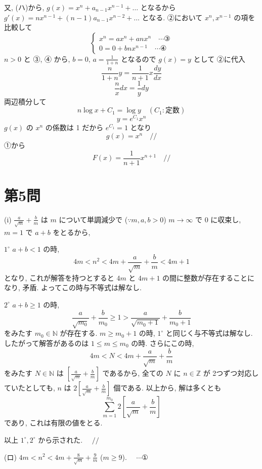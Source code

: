 \documentclass[../main.tex]{subfiles}
\begin{document}
\noindent
又, (ハ)から, $g(x) = x^n + a_{n-1} x^{n-1} + \dots$ となるから $g'(x) = n x^{n-1} + (n-1) a_{n-1} x^{n-2} + \dots$ となる. ②において $x^n, x^{n-1}$ の項を比較して
\begin{equation}
  \begin{cases}
    x^n = a x^n + a n x^n \quad \cdots \text{③} \\
    0 = 0 + b n x^{n-1} \quad \cdots \text{④}
  \end{cases}
\end{equation}
$n > 0$ と ③, ④ から, $b = 0, \, a = \frac{1}{1+n}$ となるので $g(x) = y$ として ②に代入
\[
  \frac{n}{1+n} y = \frac{1}{n+1} x \frac{dy}{dx}
\]
\[
  \frac{n}{x} dx = \frac{1}{y} dy
\]
両辺積分して
\[
  n \log x + C_1 = \log y \quad (C_1: \text{定数})
\]
\[
  y = e^{C_1} x^n
\]
$g(x)$ の $x^n$ の係数は 1 だから $e^{C_1} = 1$ となり
\[
  g(x) = x^n \quad /\!/
\]
①から
\[
  F(x) = \frac{1}{n+1} x^{n+1} \quad /\!/
\]

\newpage

\section*{第5問}

\noindent
[\textbf{解}] (i) $\frac{a}{\sqrt{m}} + \frac{b}{m}$ は $m$ について単調減少で ($\because m, a, b > 0$)
$m \to \infty$ で $0$ に収束し, $m=1$ で $a+b$ をとるから,

\bigskip
\noindent
$1^\circ$ $a+b < 1$ の時,
\[
  4m < n^2 < 4m + \frac{a}{\sqrt{m}} + \frac{b}{m} < 4m+1
\]
となり, これが解答を持つとすると $4m$ と $4m+1$ の間に整数が存在することになり, 矛盾. よってこの時与不等式は解なし.

\bigskip
\noindent
$2^\circ$ $a+b \ge 1$ の時,
\[
  \frac{a}{\sqrt{m_0}} + \frac{b}{m_0} \ge 1 > \frac{a}{\sqrt{m_0+1}} + \frac{b}{m_0+1}
\]
をみたす $m_0 \in \mathbb{N}$ が存在する. $m \ge m_0+1$ の時, $1^\circ$ と同じく与不等式は解なし. したがって解答があるのは $1 \le m \le m_0$ の時. さらにこの時,
\[
  4m < N < 4m + \frac{a}{\sqrt{m}} + \frac{b}{m}
\]
をみたす $N \in \mathbb{N}$ は $\left[ \frac{a}{\sqrt{m}} + \frac{b}{m} \right]$ であるから, 全ての $N$ に $n \in \mathbb{Z}$ が 2つずつ対応していたとしても, $n$ は $2 \left[ \frac{a}{\sqrt{m}} + \frac{b}{m} \right]$ 個である. 以上から, 解は多くとも
\[
  \sum_{m=1}^{m_0} 2 \left[ \frac{a}{\sqrt{m}} + \frac{b}{m} \right]
\]
であり, これは有限の値をとる.

\noindent
以上 $1^\circ, 2^\circ$ から示された. $\quad /\!/$

\bigskip
\noindent
(ロ) $4m < n^2 < 4m + \frac{8}{\sqrt{m}} + \frac{9}{m}$ ($m \ge 9$). $\quad \cdots \text{①}$
\end{document}
